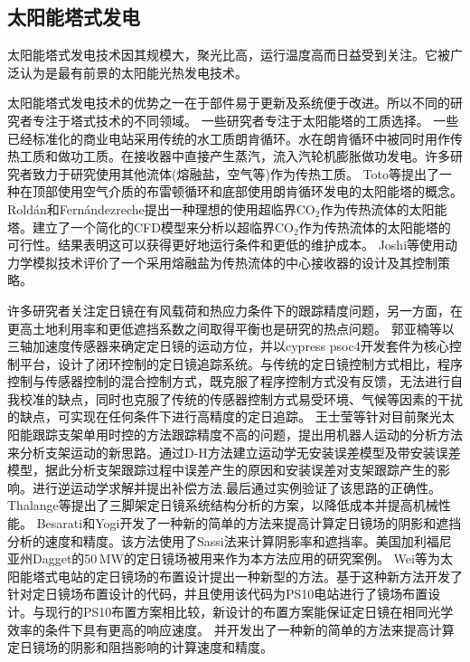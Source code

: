\subsection{太阳能塔式发电}
\label{sec:st}

太阳能塔式发电技术因其规模大，聚光比高，运行温度高而日益受到关注。它被广泛认为是最有前景的太阳能光热发电技术。

太阳能塔式发电技术的优势之一在于部件易于更新及系统便于改进。所以不同的研究者专注于塔式技术的不同领域。
一些研究者专注于太阳能塔的工质选择。
一些已经标准化的商业电站采用传统的水工质朗肯循环\cite{Spiros2017}。水在朗肯循环中被同时用作传热工质和做功工质。在接收器中直接产生蒸汽，流入汽轮机膨胀做功发电\cite{Montes2009,Feldhoff2012,Steinmann2006,Yu2017,Gonzalez2017}。许多研究者致力于研究使用其他流体(熔融盐，空气等)作为传热工质。
Toto等\cite{Toro2016}提出了一种在顶部使用空气介质的布雷顿循环和底部使用朗肯循环发电的太阳能塔的概念。
Rold\'{a}n和Fern\'{a}ndezreche\cite{Rold2016}提出一种理想的使用超临界CO$_2$作为传热流体的太阳能塔。建立了一个简化的CFD模型来分析以超临界CO$_2$作为传热流体的太阳能塔的可行性。结果表明这可以获得更好地运行条件和更低的维护成本。
Joshi等\cite{Joshi2016}使用动力学模拟技术评价了一个采用熔融盐为传热流体的中心接收器的设计及其控制策略。

许多研究者关注定日镜在有风载荷和热应力条件下的跟踪精度问题，另一方面，在更高土地利用率和更低遮挡系数之间取得平衡也是研究的热点问题。
郭亚楠等\cite{Guo2016}以三轴加速度传感器来确定定日镜的运动方位，并以cypress psoc4开发套件为核心控制平台，设计了闭环控制的定日镜追踪系统。与传统的定日镜控制方式相比，程序控制与传感器控制的混合控制方式，既克服了程序控制方式没有反馈，无法进行自我校准的缺点，同时也克服了传统的传感器控制方式易受环境、气候等因素的干扰的缺点，可实现在任何条件下进行高精度的定日追踪。
王士莹等\cite{Wang2017b}针对目前聚光太阳能跟踪支架单用时控的方法跟踪精度不高的问题，提出用机器人运动的分析方法来分析支架运动的新思路。通过D-H方法建立运动学无安装误差模型及带安装误差模型，据此分析支架跟踪过程中误差产生的原因和安装误差对支架跟踪产生的影响。进行逆运动学求解并提出补偿方法,最后通过实例验证了该思路的正确性。
Thalange等\cite{Thalange2017}提出了三脚架定日镜系统结构分析的方案，以降低成本并提高机械性能。
Besarati和Yogi\cite{Besarati2014}开发了一种新的简单的方法来提高计算定日镜场的阴影和遮挡分析的速度和精度。该方法使用了Sassi法\cite{Sassi1983}来计算阴影率和遮挡率。美国加利福尼亚州Dagget的50$\,\mathrm{MW}$的定日镜场被用来作为本方法应用的研究案例。
Wei等\cite{Wei2010}为太阳能塔式电站的定日镜场的布置设计提出一种新型的方法。基于这种新方法开发了针对定日镜场布置设计的代码，并且使用该代码为PS10电站进行了镜场布置设计。与现行的PS10布置方案相比较，新设计的布置方案能保证定日镜在相同光学效率的条件下具有更高的响应速度。
并开发出了一种新的简单的方法来提高计算定日镜场的阴影和阻挡影响的计算速度和精度。

